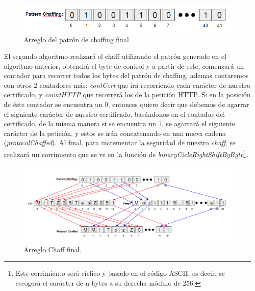 \documentclass[12pt, a4paper, titlepage]{report}
\begin{document}
    		\begin{figure}[H]
    			\begin{center}	                  \includegraphics[width=14cm]{./imagenes/Desarrollo/Prototipo_2/algorithm1_3.png}
				\caption{Arreglo del patrón de chaffing final}
    			\end{center}
    		\end{figure}
		    
		    
		    
		    El segundo algoritmo realizará el chaff utilizando el patrón generado en el algoritmo anterior, obtendrá el byte de control y a partir de este, comenzará un contador para recorrer todos los bytes del patrón de chaffing, ademas contaremos con otros 2 contadores más: \textit{contCert} que irá recorriendo cada carácter de nuestro certificado, y \textit{countHTTP} que recorrerá los de la petición HTTP. Si en la posición de éste contador se encuentra un 0, entonces quiere decir que debemos de agarrar el siguiente carácter de nuestro certificado, basándonos en el contador del certificado, de la misma manera si se encuentra un 1, se agarrará el siguiente carácter de la petición, y estos se irán concatenando en una nueva cadena (\textit{protocolChaffed}). Al final, para incrementar la seguridad de nuestro \textit{chaff}, se realizará un corrimiento que se ve en la función de \textit{binaryCicleRightShiftByByte}\footnote{Este corrimiento será cíclico y basado en el código ASCII, es decir, se escogerá el carácter de n bytes a su derecha módulo de 256.}.
		    
		    \begin{figure}[H]
    			\begin{center}	                  \includegraphics[width=14cm]{./imagenes/Desarrollo/Prototipo_2/algorithm2_1.png}
				\caption{Arreglo Chaff final.}
    			\end{center}
    		\end{figure}
		    
\end{document}

